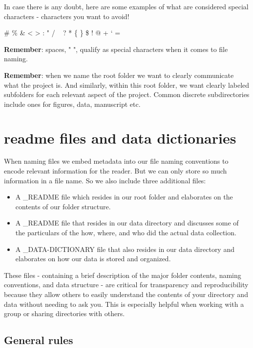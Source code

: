 \documentclass[
]{book}
\providecommand{\tightlist}{%
  \setlength{\itemsep}{0pt}\setlength{\parskip}{0pt}}
\begin{document}
In case there is any doubt, here are some examples of what are considered special characters - characters you want to avoid!

\# \% \& \textless{} \textgreater{} : " / ~\textbar{} ? * \{ \} \$ ! \textquotesingle{} @ + ` =

\textbf{Remember}: spaces, " ", qualify as special characters when it comes to file naming.

\textbf{Remember}: when we name the root folder we want to clearly communicate what the project is. And similarly, within this root folder, we want clearly labeled subfolders for each relevant aspect of the project. Common discrete subdirectories include ones for figures, data, manuscript etc.

\section{readme files and data dictionaries}\label{readme-files-and-data-dictionaries}

When naming files we embed metadata into our file naming conventions to encode relevant information for the reader. But we can only store so much information in a file name. So we also include three additional files:

\begin{itemize}
\tightlist
\item
  A \_README file which resides in our root folder and elaborates on the contents of our folder structure.
\item
  A \_README file that resides in our data directory and discusses some of the particulars of the how, where, and who did the actual data collection.
\item
  A \_DATA-DICTIONARY file that also resides in our data directory and elaborates on how our data is stored and organized.
\end{itemize}

These files - containing a brief description of the major folder contents, naming conventions, and data structure - are critical for transparency and reproducibility because they allow others to easily understand the contents of your directory and data without needing to ask you. This is especially helpful when working with a group or sharing directories with others.

\subsection*{General rules}\label{general-rules}
\end{document}
